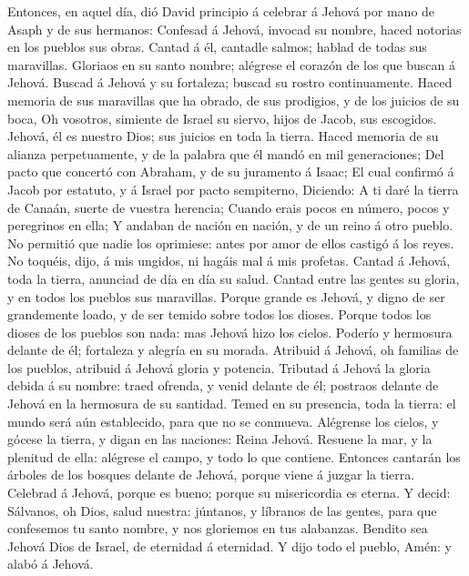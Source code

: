  Entonces, en aquel día, dió David principio á celebrar á
Jehová por mano de Asaph y de sus hermanos:  Confesad á
Jehová, invocad su nombre, haced notorias en los pueblos sus obras.
 Cantad á él, cantadle salmos; hablad de todas sus
maravillas.  Gloriaos en su santo nombre; alégrese el
corazón de los que buscan á Jehová.  Buscad á Jehová y su
fortaleza; buscad su rostro continuamente.  Haced memoria
de sus maravillas que ha obrado, de sus prodigios, y de los juicios de
su boca,  Oh vosotros, simiente de Israel su siervo,
hijos de Jacob, sus escogidos.  Jehová, él es nuestro
Dios; sus juicios en toda la tierra.  Haced memoria de su
alianza perpetuamente, y de la palabra que él mandó en mil generaciones;
 Del pacto que concertó con Abraham, y de su juramento á
Isaac;  El cual confirmó á Jacob por estatuto, y á Israel
por pacto sempiterno,  Diciendo: A ti daré la tierra de
Canaán, suerte de vuestra herencia;  Cuando erais pocos
en número, pocos y peregrinos en ella;  Y andaban de
nación en nación, y de un reino á otro pueblo.  No
permitió que nadie los oprimiese: antes por amor de ellos castigó á los
reyes.  No toquéis, dijo, á mis ungidos, ni hagáis mal á
mis profetas.  Cantad á Jehová, toda la tierra, anunciad
de día en día su salud.  Cantad entre las gentes su
gloria, y en todos los pueblos sus maravillas.  Porque
grande es Jehová, y digno de ser grandemente loado, y de ser temido
sobre todos los dioses.  Porque todos los dioses de los
pueblos son nada: mas Jehová hizo los cielos.  Poderío y
hermosura delante de él; fortaleza y alegría en su morada.
 Atribuid á Jehová, oh familias de los pueblos, atribuid
á Jehová gloria y potencia.  Tributad á Jehová la gloria
debida á su nombre: traed ofrenda, y venid delante de él; postraos
delante de Jehová en la hermosura de su santidad.  Temed
en su presencia, toda la tierra: el mundo será aún establecido, para que
no se conmueva.  Alégrense los cielos, y gócese la
tierra, y digan en las naciones: Reina Jehová.  Resuene
la mar, y la plenitud de ella: alégrese el campo, y todo lo que
contiene.  Entonces cantarán los árboles de los bosques
delante de Jehová, porque viene á juzgar la tierra. 
Celebrad á Jehová, porque es bueno; porque su misericordia es eterna.
 Y decid: Sálvanos, oh Dios, salud nuestra: júntanos, y
líbranos de las gentes, para que confesemos tu santo nombre, y nos
gloriemos en tus alabanzas.  Bendito sea Jehová Dios de
Israel, de eternidad á eternidad. Y dijo todo el pueblo, Amén: y alabó á
Jehová.


